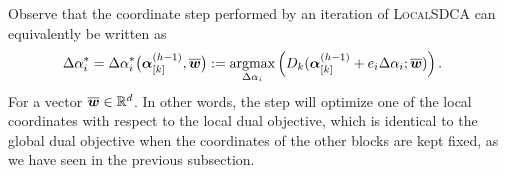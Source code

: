 \documentclass{article} %
\newcommand{\localSDCA}{\textsc{LocalSDCA}\xspace}
\begin{document}
Observe that the coordinate step performed by an iteration of 
\localSDCA can equivalently be written as
\begin{align}\label{eq:updateRule}
 \Delta\alpha_i^* = \Delta\alpha_i^*\big( \bm{\alpha}_{[k]}^{(h-1)}, \overline{{\bm{w}}}\big)
 &:=\operatorname*{argmax}_{\Delta\alpha_i}
 \left(
 D_k(\bm{\alpha}_{[k]}^{(h-1)}+e_i \Delta\alpha_i; \overline{{\bm{w}}} )
 \right).
\end{align}
For a vector $\overline{{\bm{w}}}\in\mathbb{R}^d$.
In other words, the step will optimize one of the local coordinates
with respect to the local dual objective, which is identical to the global
dual objective when the coordinates of the other blocks are kept fixed,
as we have seen in the previous subsection.
\end{document}

